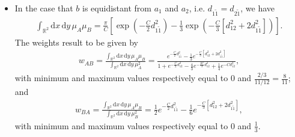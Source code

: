 \documentclass[12pt]{article}
\newcommand{\xd}{\mathrm{d}}
\numberwithin{equation}{section} %
\numberwithin{figure}{section} %
\theoremstyle{definition}
\begin{document}
\begin{itemize}
	\item In the case that $b$ is equidistant from $a_1$ and $a_2$, i.e. $d_{1 \tilde{1}} = d_{2 \tilde{1}}$, we have
\begin{align}
\int_{{\mathbb R}^2} \xd x \, \xd y \, \mu_A \mu_B 
= \frac{\pi}{C} \left[    \exp \left( - \frac{C}{2} d_{1\tilde{1} }^2 \right)  - \frac{1}{3} \exp \left( -\frac{C}{3} [d_{12}^2 + 2 d_{1 \tilde{1}}^2] \right)  \right].
\end{align}
The weights result to be given by
\begin{align}
w_{AB} = \frac{\int_{{\mathbb R}^2} \xd x \, \xd y \, \mu_A \mu_B}{\int_{{\mathbb R}^2} \xd x \, \xd y \, \mu_A^2} = \frac{  e^{- \frac{C}{2} d_{1\tilde{1} }^2 }  - \frac{1}{3} e^{-\frac{C}{3} [d_{12}^2 + 2 d_{1 \tilde{1}}^2] }  }
{ 1+e^{- \frac{C}{2}d^2_{12}} - \frac{4}{3} e^{- \frac{2C}{3} d^2_{1 2} } + \frac{1}{4} e^{- C d_{12}^2 } },%
\end{align}
with minimum and maximum values respectively equal to 0 and $\frac{2/3}{11/12}=\frac{8}{11}$; and
\begin{align}
w_{BA} = \frac{\int_{{\mathbb R}^2} \xd x \, \xd y \, \mu_A \mu_B}{\int_{{\mathbb R}^2} \xd x \, \xd y \, \mu_B^2} = \frac12 e^{- \frac{C}{2} d_{1\tilde{1} }^2 }  - \frac{1}{6} e^{-\frac{C}{3} [d_{12}^2 + 2 d_{1 \tilde{1}}^2] },
\end{align}
with minimum and maximum values respectively equal to 0 and $\frac{1}{3}$.
	
\end{itemize}
\end{document}
